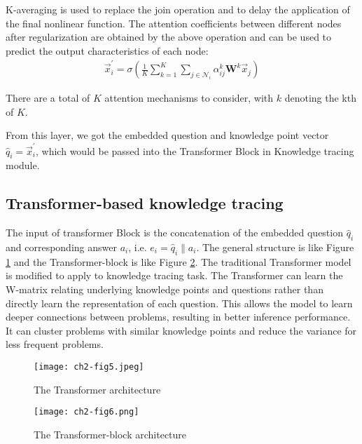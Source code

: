 K-averaging is used to replace the join operation and to delay the application of the final nonlinear function. The attention coefficients between different nodes after regularization are obtained by the above operation and can be used to predict the output characteristics of each node:
\begin{align}
	\vec{x}_{i}^{\prime}=\sigma\left(\frac{1}{K} \sum_{k=1}^{K} \sum_{j \in \mathcal{N}_{i}} \alpha_{i j}^{k} \mathbf{W}^{k} \vec{x}_{j}\right)
\end{align}

There are a total of $K$ attention mechanisms to consider, with $k$ denoting the kth of $K$.


From this layer, we got the embedded question and knowledge point vector $\hat{q}_{i} =  \vec{x}_{i}^{\prime}$, which would be passed into the Transformer Block in Knowledge tracing module.

\subsection{Transformer-based knowledge tracing}

The input of transformer Block is the concatenation of the embedded question $\hat{q}_{i}$ and corresponding answer $a_i$, i.e. $e_i=\hat{q}_{i}\|a_i$. The general structure is like Figure \ref{fig5} and the Transformer-block is like Figure \ref{fig6}. The traditional Transformer model is modified to apply to knowledge tracing task. The Transformer can learn the W-matrix relating underlying knowledge points and questions rather than directly learn the representation of each question. This allows the model to learn deeper connections between problems, resulting in better inference performance. It can cluster problems with similar knowledge points and reduce the variance for less frequent problems.
\begin{figure}[h]
	\centering
	\texttt{[image: ch2-fig5.jpeg]}
	\caption{The Transformer architecture}
	\label{fig5}
\end{figure}

\begin{figure}[h]
	\centering
	\texttt{[image: ch2-fig6.png]}
	\caption{The Transformer-block architecture}
	\label{fig6}
\end{figure}

